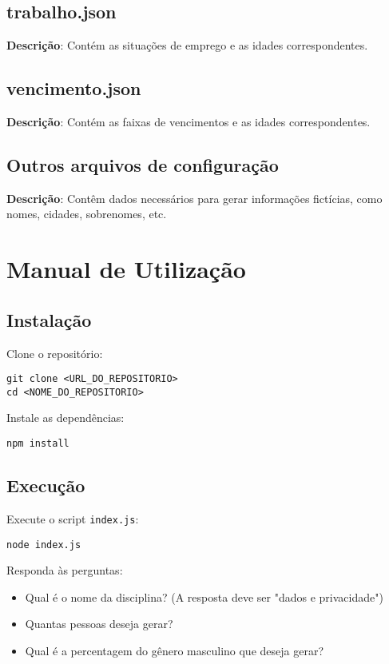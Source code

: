 \documentclass{article}
\begin{document}
\subsection{trabalho.json}
\textbf{Descrição}: Contém as situações de emprego e as idades correspondentes.

\subsection{vencimento.json}
\textbf{Descrição}: Contém as faixas de vencimentos e as idades correspondentes.

\subsection{Outros arquivos de configuração}
\textbf{Descrição}: Contêm dados necessários para gerar informações fictícias, como nomes, cidades, sobrenomes, etc.

\section{Manual de Utilização}

\subsection{Instalação}
Clone o repositório:
\begin{verbatim}
git clone <URL_DO_REPOSITORIO>
cd <NOME_DO_REPOSITORIO>
\end{verbatim}

Instale as dependências:
\begin{verbatim}
npm install
\end{verbatim}

\subsection{Execução}
Execute o script \texttt{index.js}:
\begin{verbatim}
node index.js
\end{verbatim}

Responda às perguntas:
\begin{itemize}
    \item Qual é o nome da disciplina? (A resposta deve ser "dados e privacidade")
    \item Quantas pessoas deseja gerar?
    \item Qual é a percentagem do gênero masculino que deseja gerar?
\end{itemize}
\end{document}
